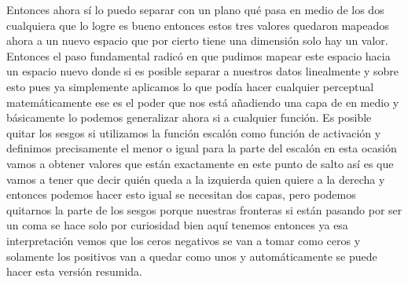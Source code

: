 Entonces ahora sí lo puedo separar con un plano qué pasa en medio de los dos cualquiera que lo logre es bueno entonces estos tres valores quedaron mapeados ahora a un nuevo espacio que por cierto tiene una dimensión solo hay un valor. Entonces el paso fundamental radicó en que pudimos mapear este espacio hacia un espacio nuevo donde si es posible separar a nuestros datos linealmente y sobre esto pues ya simplemente aplicamos lo que podía hacer cualquier perceptual matemáticamente ese es el poder que nos está añadiendo una capa de en medio y básicamente lo podemos generalizar ahora si a cualquier función. Es posible quitar los sesgos si utilizamos la función escalón como función de activación y definimos precisamente el menor o igual para la parte del escalón en esta ocasión vamos a obtener valores que están exactamente en este punto de salto así es que vamos a tener que decir quién queda a la izquierda quien quiere a la derecha y entonces podemos hacer esto igual se necesitan dos capas, pero podemos quitarnos la parte de los sesgos porque nuestras fronteras si están pasando por ser un coma se hace solo por curiosidad bien aquí tenemos entonces ya esa interpretación vemos que los ceros negativos se van a tomar como ceros y solamente los positivos van a quedar como unos y automáticamente se puede hacer esta versión resumida. 


